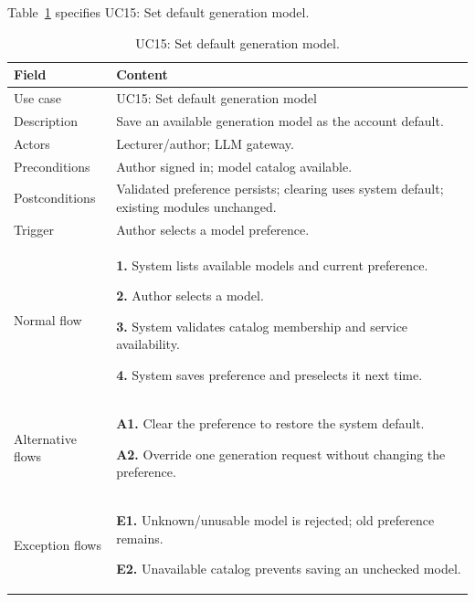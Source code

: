 \needspace{.39\textheight}
Table~\ref{tab:uc-15} specifies UC15: Set default generation model.
\begin{table}[H]\centering\footnotesize{}\renewcommand{\arraystretch}{1.05}
\caption{UC15: Set default generation model.}\label{tab:uc-15}
\begin{tabular}{|p{2.8cm}|p{11.9cm}|}\hline
\textbf{Field} & \textbf{Content}\\\hline
Use case & UC15: Set default generation model\\\hline
Description & Save an available generation model as the account default.\\\hline
Actors & Lecturer/author; LLM gateway.\\\hline
Preconditions & Author signed in; model catalog available.\\\hline
Postconditions & Validated preference persists; clearing uses system default; existing modules unchanged.\\\hline
Trigger & Author selects a model preference.\\\hline
Normal flow & \textbf{1.} System lists available models and current preference.\par \textbf{2.} Author selects a model.\par \textbf{3.} System validates catalog membership and service availability.\par \textbf{4.} System saves preference and preselects it next time.\\\hline
Alternative flows & \textbf{A1.} Clear the preference to restore the system default.\par \textbf{A2.} Override one generation request without changing the preference.\\\hline
Exception flows & \textbf{E1.} Unknown/unusable model is rejected; old preference remains.\par \textbf{E2.} Unavailable catalog prevents saving an unchecked model.\\\hline
\end{tabular}\end{table}
